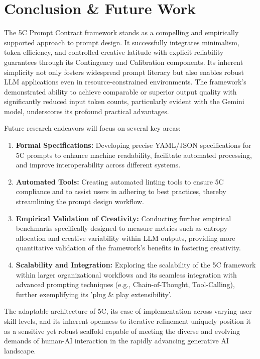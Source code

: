 \documentclass[10pt, a4paper]{article}
\begin{document}
\section{Conclusion \& Future Work}
The 5C Prompt Contract framework stands as a compelling and empirically supported approach to prompt design. It successfully integrates minimalism, token efficiency, and controlled creative latitude with explicit reliability guarantees through its Contingency and Calibration components. Its inherent simplicity not only fosters widespread prompt literacy but also enables robust LLM applications even in resource-constrained environments. The framework's demonstrated ability to achieve comparable or superior output quality with significantly reduced input token counts, particularly evident with the Gemini model, underscores its profound practical advantages.

Future research endeavors will focus on several key areas:
\begin{enumerate}
    \item \textbf{Formal Specifications:} Developing precise YAML/JSON specifications for 5C prompts to enhance machine readability, facilitate automated processing, and improve interoperability across different systems.
    \item \textbf{Automated Tools:} Creating automated linting tools to ensure 5C compliance and to assist users in adhering to best practices, thereby streamlining the prompt design workflow.
    \item \textbf{Empirical Validation of Creativity:} Conducting further empirical benchmarks specifically designed to measure metrics such as entropy allocation and creative variability within LLM outputs, providing more quantitative validation of the framework's benefits in fostering creativity.
    \item \textbf{Scalability and Integration:} Exploring the scalability of the 5C framework within larger organizational workflows and its seamless integration with advanced prompting techniques (e.g., Chain-of-Thought, Tool-Calling), further exemplifying its 'plug \& play extensibility'.
\end{enumerate}
The adaptable architecture of 5C, its ease of implementation across varying user skill levels, and its inherent openness to iterative refinement uniquely position it as a sensitive yet robust scaffold capable of meeting the diverse and evolving demands of human-AI interaction in the rapidly advancing generative AI landscape.
\end{document}
